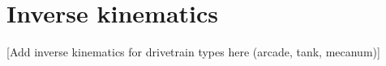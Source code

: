 \section{Inverse kinematics}

[Add inverse kinematics for drivetrain types here (arcade, tank, mecanum)]

